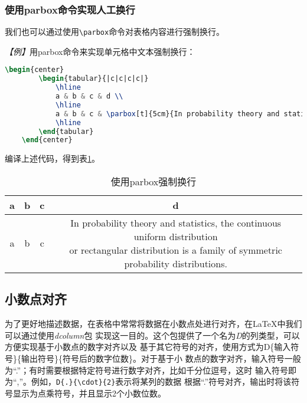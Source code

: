 \subsubsection{使用parbox命令实现人工换行}

我们也可以通过使用\texttt{\textbackslash{}parbox}命令对表格内容进行强制换行。

\emph{【例】}用parbox命令来实现单元格中文本强制换行：
\begin{lstlisting}[language=TeX]
    \begin{center}    
        \begin{tabular}{|c|c|c|c|}
            \hline
            a & b & c & d \\ 
            \hline
            a & b & c & \parbox[t]{5cm}{In probability theory and statistics, the continuous uniform distribution\\ or rectangular distribution is a family of symmetric probability distributions.} \\ 
            \hline
        \end{tabular} 
    \end{center}
\end{lstlisting}

编译上述代码，得到表\ref{tb14}。

\begin{table}[h]
    \centering
    \begin{tabular}{|c|c|c|c|}
        \hline
        a & b & c & d                                                                                         \\
        \hline
        a & b & c & \parbox[t]{5cm}{In probability theory and statistics, the continuous uniform distribution \\ or rectangular distribution is a family of symmetric probability distributions.} \\
        \hline
    \end{tabular}
    \caption{使用parbox强制换行}
    \label{tb14}
\end{table}

\subsection{小数点对齐}

为了更好地描述数据，在表格中常常将数据在小数点处进行对齐，在LaTeX中我们可以通过使用\emph{dcolumn}包
实现这一目的。这个包提供了一个名为\emph{D}的列类型，可以方便实现基于小数点的数字对齐以及
基于其它符号的对齐，使用方式为D\{输入符号\}\{输出符号\}\{符号后的数字位数\}。对于基于小
数点的数字对齐，输入符号一般为“.”；有时需要根据特定符号进行数字对齐，比如千分位逗号，这时
输入符号即为“,”。例如，\texttt{D\{.\}\{\textbackslash{}cdot\}\{2\}}表示将某列的数据
根据“.”符号对齐，输出时将该符号显示为点乘符号，并且显示2个小数位数。

